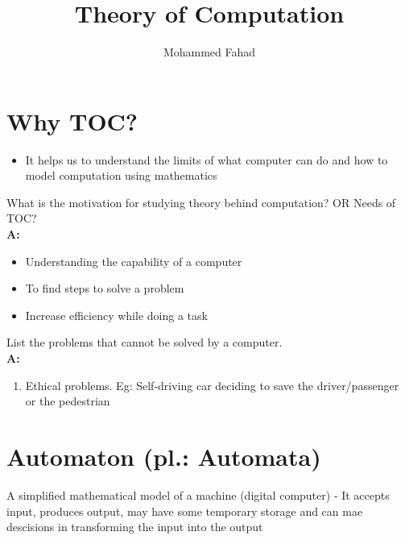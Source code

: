 \documentclass{article}
\title{Theory of Computation}
\author{Mohammed Fahad}
\newcommand{\answer}[1]{\\\textbf{A:} #1}
\begin{document}
\maketitle

\section{Why TOC?}

\begin{itemize}
    \item It helps us to understand the limits of what computer can do and how to model computation using mathematics
\end{itemize}

\begin{qanda}
    \item What is the motivation for studying theory behind computation? OR Needs of TOC?
    \answer{
        \begin{itemize}
            \item Understanding the capability of a computer
            \item To find steps to solve a problem
            \item Increase efficiency while doing a task
        \end{itemize}
    }

    \item List the problems that cannot be solved by a computer.
    \answer{
        \begin{enumerate}
            \item Ethical problems. Eg: Self-driving car deciding to save the driver/passenger or the pedestrian
        \end{enumerate}
    }

\end{qanda}

\section{Automaton (pl.: Automata)}

A simplified mathematical model of a machine (digital computer) - It accepts input, produces output, may have some temporary storage and can mae descisions in transforming the input into the output
\end{document}
